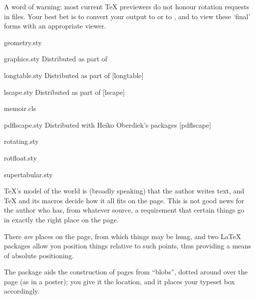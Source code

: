 A word of warning: most current \TeX{} previewers do not honour
rotation requests in  files.
Your best bet is to convert your output to \PS{} or to , and
to view these `final' forms with an appropriate viewer.
\begin{ctanrefs}
\item[geometry.sty]
\item[graphics.sty]Distributed as part of 
\item[longtable.sty]Distributed as part of [longtable]
\item[lscape.sty]Distributed as part of [lscape]
\item[memoir.cls]
\item[pdflscape.sty]Distributed with Heiko Oberdiek's packages
  [pdflscape]
\item[rotating.sty]
\item[rotfloat.sty]
\item[supertabular.sty]
\end{ctanrefs}


\TeX{}'s model of the world is (broadly speaking) that the author
writes text, and \TeX{} and its macros decide how it all fits on the
page.  This is not good news for the author who has, from whatever
source, a requirement that certain things go in exactly the right
place on the page.

There \emph{are} places on the page, from which things may be hung,
and two \LaTeX{} packages allow you position things relative to such
points, thus providing a means of absolute positioning.

The  package aids the construction of pages from
``blobs'', dotted around over the page (as in a poster); you give it
the location, and it places your typeset box accordingly.

